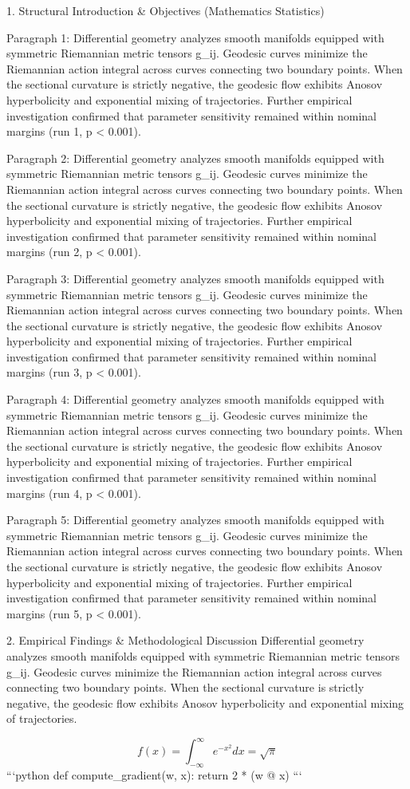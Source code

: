 1. Structural Introduction & Objectives (Mathematics Statistics)


Paragraph 1: Differential geometry analyzes smooth manifolds equipped with symmetric Riemannian metric tensors g_ij. Geodesic curves minimize the Riemannian action integral across curves connecting two boundary points. When the sectional curvature is strictly negative, the geodesic flow exhibits Anosov hyperbolicity and exponential mixing of trajectories. Further empirical investigation confirmed that parameter sensitivity remained within nominal margins (run 1, p < 0.001).

Paragraph 2: Differential geometry analyzes smooth manifolds equipped with symmetric Riemannian metric tensors g_ij. Geodesic curves minimize the Riemannian action integral across curves connecting two boundary points. When the sectional curvature is strictly negative, the geodesic flow exhibits Anosov hyperbolicity and exponential mixing of trajectories. Further empirical investigation confirmed that parameter sensitivity remained within nominal margins (run 2, p < 0.001).

Paragraph 3: Differential geometry analyzes smooth manifolds equipped with symmetric Riemannian metric tensors g_ij. Geodesic curves minimize the Riemannian action integral across curves connecting two boundary points. When the sectional curvature is strictly negative, the geodesic flow exhibits Anosov hyperbolicity and exponential mixing of trajectories. Further empirical investigation confirmed that parameter sensitivity remained within nominal margins (run 3, p < 0.001).

Paragraph 4: Differential geometry analyzes smooth manifolds equipped with symmetric Riemannian metric tensors g_ij. Geodesic curves minimize the Riemannian action integral across curves connecting two boundary points. When the sectional curvature is strictly negative, the geodesic flow exhibits Anosov hyperbolicity and exponential mixing of trajectories. Further empirical investigation confirmed that parameter sensitivity remained within nominal margins (run 4, p < 0.001).

Paragraph 5: Differential geometry analyzes smooth manifolds equipped with symmetric Riemannian metric tensors g_ij. Geodesic curves minimize the Riemannian action integral across curves connecting two boundary points. When the sectional curvature is strictly negative, the geodesic flow exhibits Anosov hyperbolicity and exponential mixing of trajectories. Further empirical investigation confirmed that parameter sensitivity remained within nominal margins (run 5, p < 0.001).


2. Empirical Findings & Methodological Discussion
Differential geometry analyzes smooth manifolds equipped with symmetric Riemannian metric tensors g_ij. Geodesic curves minimize the Riemannian action integral across curves connecting two boundary points. When the sectional curvature is strictly negative, the geodesic flow exhibits Anosov hyperbolicity and exponential mixing of trajectories.

$$ f(x) = \int_{-\infty}^{\infty} e^{-x^2} dx = \sqrt{\pi} $$ 
```python
def compute_gradient(w, x):
    return 2 * (w @ x)
```